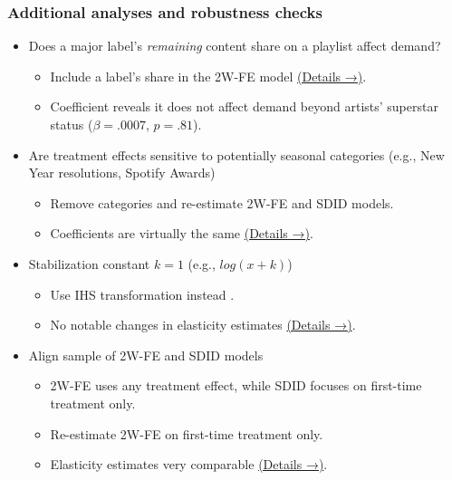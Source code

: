 \documentclass[8pt]{beamer}
\begin{document}
\begin{frame}[label=shortversion]
\label{rob:overview}
    \frametitle{Additional analyses and robustness checks}
    
    \begin{itemize}
        \item Does a major label's \textit{remaining} content share on a playlist affect demand? 
            \begin{itemize}
                \item Include a label's share in the 2W-FE model \hyperlink{rob:firsttime}{(Details →)}.
                \item Coefficient reveals it does not affect demand beyond artists' superstar status ($\beta=.0007$, $p=.81$).
            \end{itemize}
        \item Are treatment effects sensitive to potentially seasonal categories (e.g., New Year resolutions, Spotify Awards)
        \begin{itemize}
            \item Remove categories and re-estimate 2W-FE and SDID models.
            \item Coefficients are virtually the same \hyperlink{rob:seasonal}{(Details →)}.
        \end{itemize}
        \item Stabilization constant $k=1$ (e.g., $log(x+k)$)
            \begin{itemize}
                \item Use IHS transformation instead \citep{ihs}.
                \item No notable changes in elasticity estimates \hyperlink{rob:ihs}{(Details →)}.
            \end{itemize}
        \item Align sample of 2W-FE and SDID models
            \begin{itemize}
                \item 2W-FE uses any treatment effect, while SDID focuses on first-time treatment only.
                \item Re-estimate 2W-FE on first-time treatment only.
                \item Elasticity estimates very comparable \hyperlink{rob:firsttime}{(Details →)}.
            \end{itemize}
    \end{itemize}
\end{frame}
\end{document}
